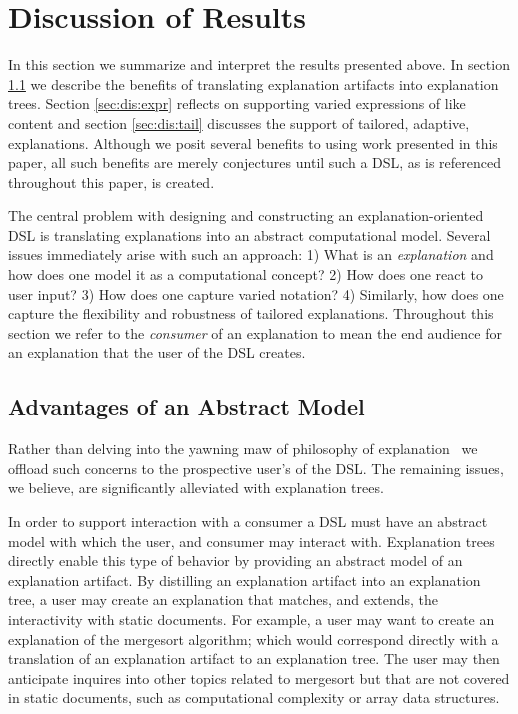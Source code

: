 \documentclass[sigconf]{acmart}
\begin{document}
\section{Discussion of Results}
\label{sec:dis}
In this section we summarize and interpret the results presented above. In
section \ref{sec:dis:model} we describe the benefits of translating explanation
artifacts into explanation trees. Section \ref{sec:dis:expr} reflects on
supporting varied expressions of like content and section \ref{sec:dis:tail}
discusses the support of tailored, adaptive, explanations. Although we posit
several benefits to using work presented in this paper, all such benefits are
merely conjectures until such a DSL, as is referenced throughout this paper, is
created. 

The central problem with designing and constructing an explanation-oriented DSL
is translating explanations into an abstract computational model. Several issues
immediately arise with such an approach: 1) What is an \emph{explanation} and
how does one model it as a computational concept? 2) How does one react to user
input? 3) How does one capture varied notation? 4) Similarly, how does one
capture the flexibility and robustness of tailored explanations. Throughout this
section we refer to the \emph{consumer} of an explanation to mean the end
audience for an explanation that the user of the DSL creates.

\subsection{Advantages of an Abstract Model}
\label{sec:dis:model}

Rather than delving into the yawning maw of philosophy of
explanation~\cite{sep-scientific-explanation} we offload such concerns to the
prospective user's of the DSL. The remaining issues, we believe, are
significantly alleviated with explanation trees.

In order to support interaction with a consumer a DSL must have an abstract
model with which the user, and consumer may interact with. Explanation trees
directly enable this type of behavior by providing an abstract model of an
explanation artifact.
%
By distilling an explanation artifact into an explanation tree, a user may
create an explanation that matches, and extends, the interactivity with static
documents. For example, a user may want to create an explanation of the
mergesort algorithm; which would correspond directly with a translation of an
explanation artifact to an explanation tree. The user may then anticipate
inquires into other topics related to mergesort but that are not covered in
static documents, such as computational complexity or array data structures.
\end{document}
